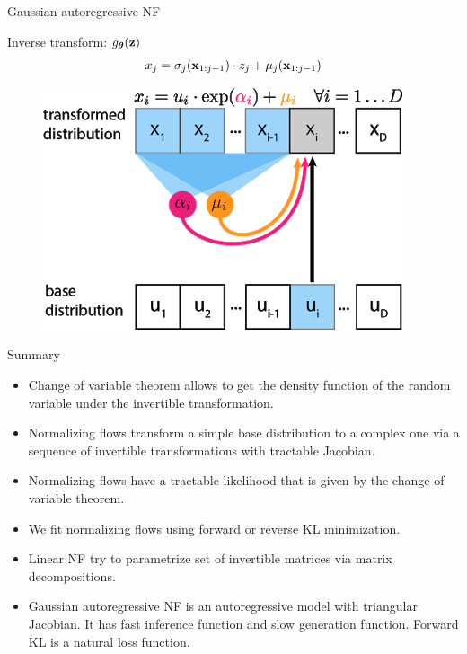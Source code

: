 \begin{frame}{Gaussian autoregressive NF}
	\begin{minipage}[t]{0.65\columnwidth}
		\begin{block}{Inverse transform: $g_{\boldsymbol{\theta}}(\mathbf{z})$}
			\[
			x_j = \sigma_j (\mathbf{x}_{1:j-1}) \cdot z_j + \mu_j(\mathbf{x}_{1:j-1})
			\]
		\end{block}
	\end{minipage}%
	\begin{minipage}[t]{0.35\columnwidth}
		\begin{figure}[h]
			\centering
			\includegraphics[width=.9\linewidth]{figs/af_iaf_explained_1.png}
		\end{figure}
	\end{minipage}
\end{frame}
\begin{frame}{Summary}
	\begin{itemize}
		\item Change of variable theorem allows to get the density function of the random variable under the invertible transformation.
		\vfill
		\item Normalizing flows transform a simple base distribution to a complex one via a sequence of invertible transformations with tractable Jacobian.
		\vfill
		\item Normalizing flows have a tractable likelihood that is given by the change of variable theorem.
		\vfill
		\item We fit normalizing flows using forward or reverse KL minimization. 
		\vfill 
		\item Linear NF try to parametrize set of invertible matrices via matrix decompositions.
		\vfill
		\item Gaussian autoregressive NF is an autoregressive model with triangular Jacobian. It has fast inference function and slow generation function. Forward KL is a natural loss function.
	\end{itemize}
\end{frame}
 